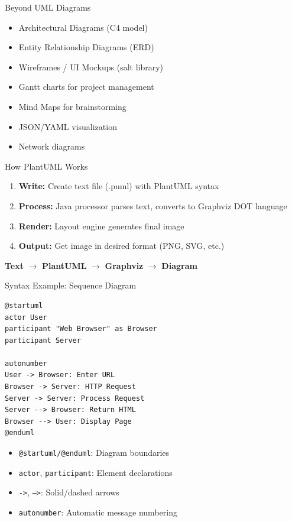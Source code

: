 \documentclass{beamer}
\begin{document}
\begin{frame}{Beyond UML Diagrams}
    \begin{itemize}
        \item Architectural Diagrams (C4 model)
        \item Entity Relationship Diagrams (ERD)
        \item Wireframes / UI Mockups (salt library)
        \item Gantt charts for project management
        \item Mind Maps for brainstorming
        \item JSON/YAML visualization
        \item Network diagrams
    \end{itemize}
\end{frame}

\begin{frame}{How PlantUML Works}
    \begin{enumerate}
        \item \textbf{Write:} Create text file (.puml) with PlantUML syntax
        \item \textbf{Process:} Java processor parses text, converts to Graphviz DOT language
        \item \textbf{Render:} Layout engine generates final image
        \item \textbf{Output:} Get image in desired format (PNG, SVG, etc.)
    \end{enumerate}
    
    \begin{center}
    \textbf{Text} $\rightarrow$ \textbf{PlantUML} $\rightarrow$ \textbf{Graphviz} $\rightarrow$ \textbf{Diagram}
    \end{center}
\end{frame}

\begin{frame}[fragile]{Syntax Example: Sequence Diagram}
    \begin{lstlisting}[style=plantuml]
@startuml
actor User
participant "Web Browser" as Browser
participant Server

autonumber
User -> Browser: Enter URL
Browser -> Server: HTTP Request
Server -> Server: Process Request
Server --> Browser: Return HTML
Browser --> User: Display Page
@enduml
    \end{lstlisting}
    
    \small
    \begin{itemize}
        \item \texttt{@startuml/@enduml}: Diagram boundaries
        \item \texttt{actor}, \texttt{participant}: Element declarations
        \item \texttt{->}, \texttt{-->}: Solid/dashed arrows
        \item \texttt{autonumber}: Automatic message numbering
    \end{itemize}
\end{frame}
\end{document}
